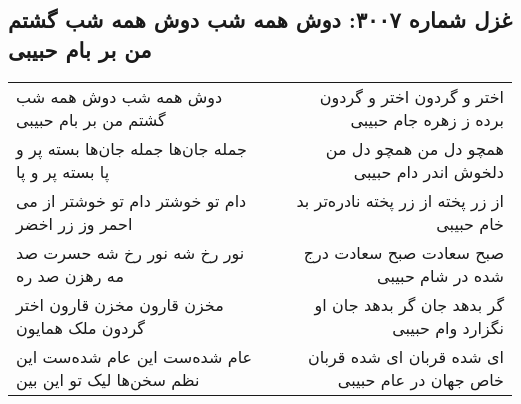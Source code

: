 \begin{center}
\section*{غزل شماره ۳۰۰۷: دوش همه شب دوش همه شب گشتم من بر بام حبیبی}
\label{sec:3007}
\begin{longtable}{l p{0.5cm} r}
دوش همه شب دوش همه شب گشتم من بر بام حبیبی
&&
اختر و گردون اختر و گردون برده ز زهره جام حبیبی
\\
جمله جان‌ها جمله جان‌ها بسته پر و پا بسته پر و پا
&&
همچو دل من همچو دل من دلخوش اندر دام حبیبی
\\
دام تو خوشتر دام تو خوشتر از می احمر وز زر اخضر
&&
از زر پخته از زر پخته نادره‌تر بد خام حبیبی
\\
نور رخ شه نور رخ شه حسرت صد مه رهزن صد ره
&&
صبح سعادت صبح سعادت درج شده در شام حبیبی
\\
مخزن قارون مخزن قارون اختر گردون ملک همایون
&&
گر بدهد جان گر بدهد جان او نگزارد وام حبیبی
\\
عام شده‌ست این عام شده‌ست این نظم سخن‌ها لیک تو این بین
&&
ای شده قربان ای شده قربان خاص جهان در عام حبیبی
\\
\end{longtable}
\end{center}
